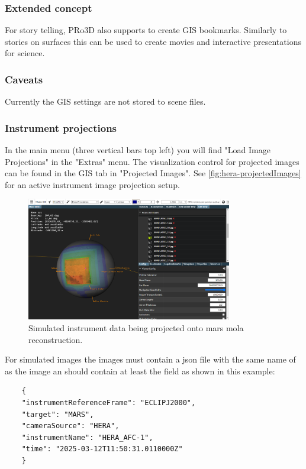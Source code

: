 \hypertarget{extended-concept}{%
	\subsubsection{Extended concept}\label{extended-concept}}

For story telling, PRo3D also supports to create GIS bookmarks.
Similarly to stories on surfaces this can be used to create movies and
interactive presentations for science.

\hypertarget{caveats}{%
	\subsubsection{Caveats}\label{caveats}}

Currently the GIS settings are not stored to scene files.

\subsubsection{Instrument projections}
\label{sec:instrumentProjections}

In the main menu (three vertical bars top left) you will find "Load Image Projections" in the "Extras" menu.
The visualization control for projected images can be found in the GIS tab in "Projected Images".
See \autoref{fig:hera-projectedImages} for an active instrument image projection setup.

\begin{figure}[h!]
	\centering
	\includegraphics[width=0.8\textwidth]{pics/hera-projectedImages.png}
	\caption{Simulated instrument data being projected onto mars mola reconstruction.}
	\label{fig:hera-projectedImages}
\end{figure}

For simulated images the images must contain a json file with the same name of as the image an should contain at least the field as shown in this example:
\begin{verbatim}
	{
	"instrumentReferenceFrame": "ECLIPJ2000",
	"target": "MARS",
	"cameraSource": "HERA",
	"instrumentName": "HERA_AFC-1",
	"time": "2025-03-12T11:50:31.0110000Z"
	}
\end{verbatim}

